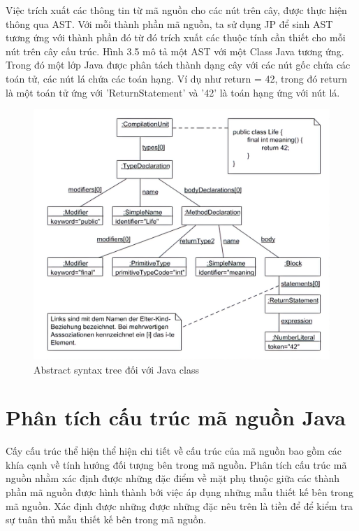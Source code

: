 \documentclass[12pt]{report}
\begin{document}
\noindent Việc trích xuất các thông tin từ mã nguồn cho các nút trên cây, được thực hiện thông qua AST. Với mỗi thành phần mã nguồn, ta sử dụng JP để sinh AST tương ứng với thành phần đó từ đó trích xuất các thuộc tính cần thiết cho mỗi nút trên cây cấu trúc.
Hình 3.5 mô tả một AST với một Class Java tương ứng. Trong đó một lớp Java được phân tách thành dạng cây với các nút gốc chứa các toán tử, các nút lá chứa các toán hạng. Ví dụ như return = 42, trong đó return là một toán tử ứng với 'ReturnStatement' và '42' là toán hạng ứng với nút lá.
\begin{figure}[!htbp]
	\centering
	\includegraphics[scale=1]{images/ast_class_java-boring}
	\caption{Abstract syntax tree đối với Java class}
	\label{fig:ast_for_java_class}
\end{figure}
\newpage
\section{Phân tích cấu trúc mã nguồn Java}
\indent Cấy cấu trúc thể hiện thể hiện chi tiết về cấu trúc của mã nguồn bao gồm các khía cạnh về tính hướng đối tượng bên trong mã nguồn. Phân tích cấu trúc mã nguồn nhằm xác định được những đặc điểm về mặt phụ thuộc giữa các thành phần mã nguồn được hình thành bới việc áp dụng những mẫu thiết kế bên trong mã nguồn. Xác định được những được những đặc nêu trên là tiền để để kiểm tra sự tuân thủ mẫu thiết kế bên trong mã nguồn.
\end{document}
